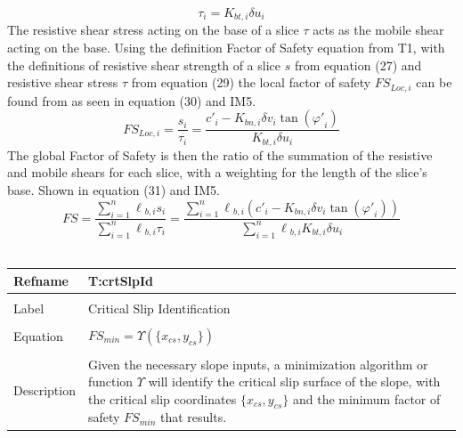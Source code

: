 \documentclass[12pt]{article}
\begin{document}
\begin{dmath}
\tau{}_{i}={K_{bt,i}} {\delta{}u}_{i}
\end{dmath}
The resistive shear stress acting on the base of a slice $\tau{}$ acts as the mobile shear acting on the base. Using the definition Factor of Safety equation from T1, with the definitions of resistive shear strength of a slice $s$ from equation (27) and resistive shear stress $\tau{}$ from equation (29) the local factor of safety ${FS_{Loc,i}}$ can be found from as seen in equation (30) and IM5.
\begin{dmath}
{FS_{Loc,i}}=\frac{s_{i}}{\tau{}_{i}}=\frac{{c'}_{i}-{K_{bn,i}} {\delta{}v}_{i} \tan\left({\varphi{}'}_{i}\right)}{{K_{bt,i}} {\delta{}u}_{i}}
\end{dmath}
The global Factor of Safety is then the ratio of the summation of the resistive and mobile shears for each slice, with a weighting for the length of the slice's base. Shown in equation (31) and IM5.
\begin{dmath}
FS=\frac{\displaystyle\sum_{i=1}^{n}{{\ell{}_{b,i}} s_{i}}}{\displaystyle\sum_{i=1}^{n}{{\ell{}_{b,i}} \tau{}_{i}}}=\frac{\displaystyle\sum_{i=1}^{n}{{\ell{}_{b,i}} \left({c'}_{i}-{K_{bn,i}} {\delta{}v}_{i} \tan\left({\varphi{}'}_{i}\right)\right)}}{\displaystyle\sum_{i=1}^{n}{{\ell{}_{b,i}} {K_{bt,i}} {\delta{}u}_{i}}}
\end{dmath}
~\newline
\noindent \begin{minipage}{\textwidth}
\begin{tabular}{p{} p{}}
\toprule \textbf{Refname} & \textbf{T:crtSlpId}
\label{T:crtSlpId}
\\ \midrule \\
Label & Critical Slip Identification
\\ \midrule \\
Equation & ${FS_{min}}=\Upsilon{}\left(\{{x_{cs}}{,y_{cs}}\}\right)$
\\ \midrule \\
Description & Given the necessary slope inputs, a minimization algorithm or function $\Upsilon{}$ will identify the critical slip surface of the slope, with the critical slip coordinates $\{{x_{cs}}{,y_{cs}}\}$ and the minimum factor of safety ${FS_{min}}$ that results.
\\ \bottomrule \end{tabular}
\end{minipage}\\
\end{document}
